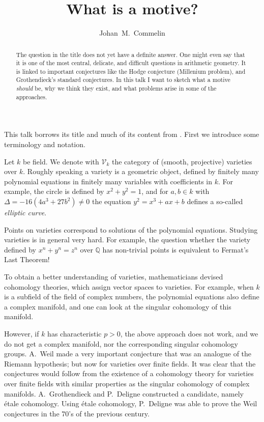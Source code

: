 \documentclass[a4paper,10pt]{article}
\title{What is a motive?}
\author{Johan~M.~Commelin}
\begin{document}
\maketitle

\begin{abstract} %
	The question in the title does not yet have a definite answer. One
	might even say that it is one of the most central, delicate, and
	difficult questions in arithmetic geometry. It is linked to important
	conjectures like the Hodge conjecture (Millenium problem), and
	Grothendieck's standard conjectures. In this talk I want to sketch what
	a motive \emph{should} be, why we think they exist, and what problems
	arise in some of the approaches.
\end{abstract} %

This talk borrows its title and much of its content from \cite{mazur,milne}.
First we introduce some terminology and notation.

Let $k$ be field. We denote with $\mathcal{V}_{k}$ the category of (smooth,
projective) varieties over $k$. Roughly speaking a variety is a geometric
object, defined by finitely many polynomial equations in finitely many
variables with coefficients in $k$. For example, the circle is defined by
$x^{2} + y^{2} = 1$, and for $a,b \in k$ with $\Delta = -16(4a^{3} + 27b^{2})
\ne 0$ the equation $y^{2} = x^{3} + ax + b$ defines a so-called \emph{elliptic
curve}.

Points on varieties correspond to solutions of the polynomial equations.
Studying varieties is in general very hard. For example, the question whether
the variety defined by $x^{n} + y^{n} = z^{n}$ over $\mathbb{Q}$ has
non-trivial points is equivalent to Fermat's Last Theorem!

To obtain a better understanding of varieties, mathematicians devised
cohomology theories, which assign vector spaces to varieties. For example, when
$k$ is a subfield of the field of complex numbers, the polynomial equations
also define a complex manifold, and one can look at the singular cohomology of
this manifold.

However, if $k$ has characteristic $p > 0$, the above approach does not work,
and we do not get a complex manifold, nor the corresponding singular cohomology
groups. A.~Weil made a very important conjecture that was an analogue of the
Riemann hypothesis; but now for varieties over finite fields. It was clear that
the conjectures would follow from the existence of a cohomology theory for
varieties over finite fields with similar properties as the singular cohomology
of complex manifolds. A.~Grothendieck and P.~Deligne constructed a candidate,
namely \'{e}tale cohomology. Using \'{e}tale cohomology, P.~Deligne was able to
prove the Weil conjectures in the 70's of the previous century.
\end{document}
